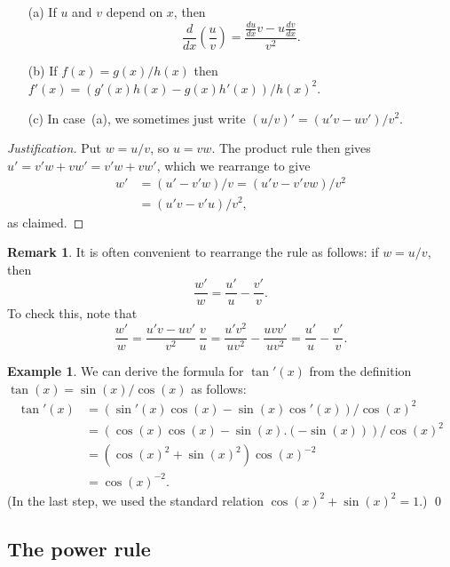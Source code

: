 \documentclass[a4paper]{book}
\renewcommand{\:}{\colon}
\theoremstyle{definition}
\newtheorem{remark}[theorem]{Remark}
\newtheorem{example}[theorem]{Example}
\begin{document}
\begin{itemize}
 \item[(a)] If $u$ and $v$ depend on $x$, then
  \[ \frac{d}{dx}\left(\frac{u}{v}\right) = 
     \frac{\tfrac{du}{dx}v-u\tfrac{dv}{dx}}{v^2}.
  \] 
 \item[(b)] If $f(x)=g(x)/h(x)$ then
  $f'(x)=(g'(x)h(x)-g(x)h'(x))/h(x)^2$.
 \item[(c)] In case~(a), we sometimes just write
  $(u/v)'=(u'v-uv')/v^2$.
\end{itemize}
\begin{proof}[Justification]
 Put $w=u/v$, so $u=vw$.  The product rule then gives
 $u'=v'w+vw'=v'w+vw'$, which we rearrange to give
 \begin{align*}
  w' &= (u'-v'w)/v = (u'v-v'vw)/v^2 \\
     &= (u'v-v'u)/v^2,
 \end{align*}
 as claimed.
\end{proof}
\begin{remark}
 It is often convenient to rearrange the rule as follows: if $w=u/v$,
 then 
 \[ \frac{w'}{w} = \frac{u'}{u} - \frac{v'}{v}. \]
 To check this, note that
 \[ \frac{w'}{w} = \frac{u'v-uv'}{v^2}\,\frac{v}{u} 
     = \frac{u'v^2}{uv^2} - \frac{uvv'}{uv^2} 
     = \frac{u'}{u} - \frac{v'}{v}.
 \]  
\end{remark}
\begin{example}
 We can derive the formula for $\tan'(x)$ from the definition
 $\tan(x)=\sin(x)/\cos(x)$ as follows:
 \begin{align*}
  \tan'(x) &= (\sin'(x)\cos(x) - \sin(x)\cos'(x))/\cos(x)^2 \\
           &= (\cos(x)\cos(x) - \sin(x).(-\sin(x)))/\cos(x)^2 \\
           &= (\cos(x)^2 + \sin(x)^2) \cos(x)^{-2} \\
           &= \cos(x)^{-2}.
 \end{align*}
 (In the last step, we used the standard relation
 $\cos(x)^2+\sin(x)^2=1$.) \qed
\end{example}

\subsection{The power rule}
\label{subsec-rule-pow}
\end{document}
